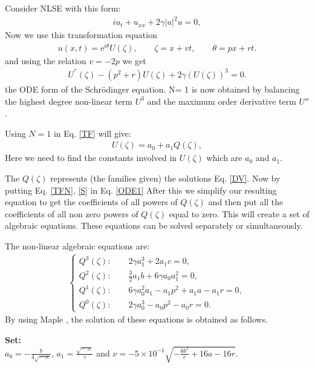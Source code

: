 \documentclass[10pt]{NSP1}
\numberwithin{equation}{section}
\begin{document}
Consider NLSE with this form:
\begin{eqnarray}\label{NLSE}
i u_{t}+u_{\mathit{xx}}+2 \gamma  {| u |}^{2} u = 0,
\end{eqnarray}
Now we use this transformation equation
\begin{eqnarray}\label{TFN}
u \! \left(x , t\right) ={\mathrm e}^{i\theta} U \! \left(\zeta \right),   \qquad \zeta = x + v t,  \qquad \theta = p x + r t.
\end{eqnarray}
and using the relation $v=-2p$ we get
\begin{eqnarray}\label{ODE1}
U^{''}{(\zeta)}-\left(p^{2}+r \right) U \! \left(\zeta \right)+2 \gamma \! \left(U \! \left(\zeta \right)\right)^{3}=0.
\end{eqnarray}
the ODE form of the Schr\"odinger equation. N= 1 is now obtained by balancing the highest degree non-linear term $U^{3}$ and the maximum order derivative term $U''$.

Using $N=1$ in Eq. \ref{TF} will give:
\begin{eqnarray}\label{S}
U \! \left(\zeta \right)= a_{0} + a_{1} Q \! \left(\zeta \right),
\end{eqnarray}
Here we need to find the constants involved in $U{(\zeta)}$ which are $a_{0}$ and $a_{1}$.

The $Q{(\zeta)}$ represents (the families given) the solutions Eq. \ref{DV}. Now by putting Eq. \ref{TFN}, \ref{S} in Eq. \ref{ODE1} After this we simplify our resulting equation to get the coefficients of all powers of ${Q(\zeta)}$ and then put all the coefficients of all non zero powers of $Q{(\zeta)}$ equal to zero. This will create a set of algebraic equations. These equations can be solved separately or simultaneously.

The non-linear algebraic equations are:
\begin{align}
\begin{cases}
Q^{3}{(\zeta)}:\qquad2 \gamma  a_{1}^{3}+2 a_{1} c = 0,\\
Q^{2}{(\zeta)}:\qquad\frac{3}{2} a_{1} b +6 \gamma  a_{0} a_{1}^{2} = 0,\\
Q^{1}{(\zeta)}:\qquad6 \gamma  a_{0}^{2} a_{1}-a_{1} p^{2}+a_{1} a -a_{1} r = 0,\\
Q^{0}{(\zeta)}:\qquad2 \gamma  a_{0}^{3}-a_{0} p^{2}-a_{0} r = 0.
\end{cases}
\end{align}
By using Maple ,  the solution of these equations is obtained as follows.

\textbf{Set:}\\
$a_{0} = -\frac{b}{4 \sqrt{-\gamma  c}}$, $a_{1} = \frac{\sqrt{-\gamma  c}}{\gamma}$ and $\nu = - 5\times 10^{-1} \sqrt{-\frac{6 b^{2}}{c}+16 a -16 r}$.
\end{document}
